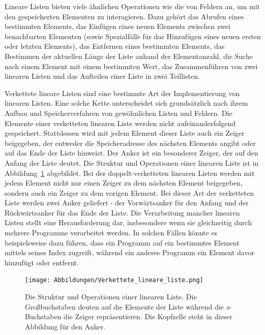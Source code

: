 Lineare Listen bieten viele ähnlichen Operationen wie die von Feldern an, um mit den gespeicherten Elementen zu interagieren. Dazu gehört das Abrufen eines bestimmten Elements, das Einfügen eines neuen Elements zwischen zwei benachbarten Elementen (sowie Spezialfälle für das Hinzufügen eines neuen ersten oder letzten Elements), das Entfernen eines bestimmten Elements, das Bestimmen der aktuellen Länge der Liste anhand der Elementanzahl, die Suche nach einem Element mit einem bestimmten Wert, das Zusammenführen von zwei linearen Listen und das Aufteilen einer Liste in zwei Teillisten.\autocite[42-43]{ollmert_datenstrukturen_2020}


Verkettete lineare Listen sind eine bestimmte Art der Implementierung von linearen Listen. Eine solche Kette unterscheidet sich grundsätzlich nach ihrem Aufbau und Speicherverfahren von gewöhnlichen Listen und Feldern. Die Elemente einer verketteten linearen Liste werden nicht aufeinanderfolgend gespeichert. Stattdessen wird mit jedem Element dieser Liste auch ein Zeiger beigegeben, der entweder die Speicheradresse des nächsten Elements angibt oder auf das Ende der Liste hinweist. Der Anker ist ein besonderer Zeiger, der auf den Anfang der Liste deutet. Die Struktur und Operationen einer linearen Liste ist in Abbildung~\ref{fig:linear_list} abgebildet. Bei der doppelt-verketteten linearen Listen werden mit jedem Element nicht nur einen Zeiger zu dem nächsten Element beigegeben, sondern auch ein Zeiger zu dem vorigen Element. Bei dieser Art der verketteten Liste werden zwei Anker geliefert - der Vorwärtsanker für den Anfang und der Rückwärtsanker für das Ende der Liste. Die Verarbeitung mancher linearen Listen stellt eine Herausforderung dar, insbesondere wenn sie gleichzeitig durch mehrere Programme verarbeitet werden. In solchen Fällen könnte es beispielsweise dazu führen, dass ein Programm auf ein bestimmtes Element mittels seines Index zugreift, während ein anderes Programm ein Element davor hinzufügt oder entfernt. \autocite[43-44]{ollmert_datenstrukturen_2020}

\begin{figure}[t]
	\texttt{[image: Abbildungen/Verkettete\_lineare\_liste.png]}
	\centering
	\caption[Lineare Liste]{Die Struktur und Operationen einer linearen Liste. Die Großbuchstaben deuten auf die Elemente der Liste während die \textit{z}-Buchstaben die Zeiger repräsentieren. Die Kopfzelle steht in dieser Abbildung für den Anker.\autocite[611]{ernst_grundkurs_2020}}
	\label{fig:linear_list}
\end{figure}

